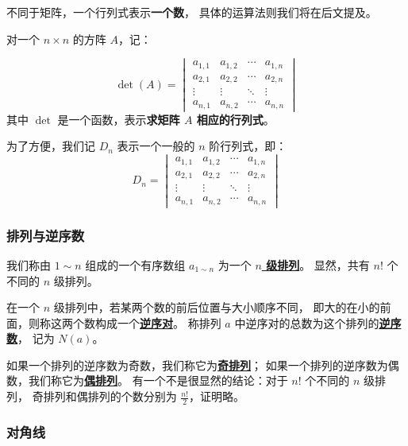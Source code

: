 \documentclass[UTF8]{article}
\begin{document}
	不同于矩阵，一个行列式表示\textbf{一个数}，
	具体的运算法则我们将在后文提及。

	\bigskip

	对一个 $n \times n$ 的方阵 $A$，记：

	\begin{equation*}
		\det(A) =
		\begin{vmatrix}
			a_{1, 1} & a_{1, 2} & \cdots & a_{1, n}
			\\
			a_{2, 1} & a_{2, 2} & \cdots & a_{2, n}
			\\
			\vdots & \vdots & \ddots & \vdots
			\\
			a_{n, 1} & a_{n, 2} & \cdots & a_{n, n}
		\end{vmatrix}
	\end{equation*}
	其中 $\det$ 是一个函数，表示\textbf{求矩阵 $A$ 相应的行列式}。

	\bigskip

	为了方便，我们记 $D_n$ 表示一个一般的 $n$ 阶行列式，即：
	\begin{equation*}
		D_n =
		\begin{vmatrix}
			a_{1, 1} & a_{1, 2} & \cdots & a_{1, n}
			\\
			a_{2, 1} & a_{2, 2} & \cdots & a_{2, n}
			\\
			\vdots & \vdots & \ddots & \vdots
			\\
			a_{n, 1} & a_{n, 2} & \cdots & a_{n, n}
		\end{vmatrix}
	\end{equation*}

	\subsubsection{排列与逆序数}

	我们称由 $1 \sim n$ 组成的一个有序数组
	$a_{1 \sim n}$ 为一个 \textbf{\uline{$n$ 级排列}}。
	显然，共有 $n!$ 个不同的 $n$ 级排列。

	在一个 $n$ 级排列中，若某两个数的前后位置与大小顺序不同，
	即大的在小的前面，则称这两个数构成一个\textbf{\uline{逆序对}}。
	称排列 $a$ 中逆序对的总数为这个排列的\textbf{\uline{逆序数}}，
	记为 $N(a)$。

	如果一个排列的逆序数为奇数，我们称它为\textbf{\uline{奇排列}}；
	如果一个排列的逆序数为偶数，我们称它为\textbf{\uline{偶排列}}。
	有一个不是很显然的结论：对于 $n!$ 个不同的 $n$ 级排列，
	奇排列和偶排列的个数分别为 $\frac {n!} {2}$，证明略。

	\subsubsection{对角线}
\end{document}
